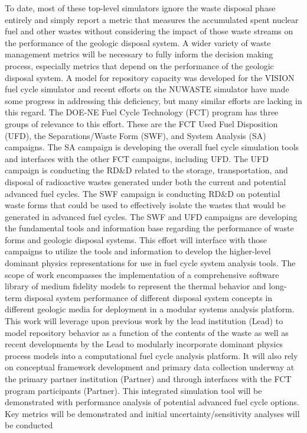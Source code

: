 To date, most of these top-level simulators ignore the waste disposal 
phase entirely and simply report a metric that measures the 
accumulated spent nuclear fuel and other wastes without considering 
the impact of those waste streams on the performance of the geologic 
disposal system.  A wider variety of waste management metrics will be 
necessary to fully inform the decision making process, especially 
metrics that depend on the performance of the geologic disposal 
system.  A model for repository capacity was developed for the VISION 
fuel cycle simulator \cite{yacout_visionverifiable_2006} and recent efforts on the NUWASTE 
simulator \cite{ abkowitz_nuclear_2010} have made some progress in addressing this 
deficiency, but many similar efforts are lacking in this regard.  The 
DOE-NE Fuel Cycle Technology (FCT) program has three groups of 
relevance to this effort.  These are the FCT Used Fuel Disposition 
(UFD), the Separations/Waste Form (SWF), and System Analysis (SA) 
campaigns.  The SA campaign is developing the overall fuel cycle 
simulation tools and interfaces with the other FCT campaigns, 
including UFD.  The UFD campaign is conducting the RD\&D related to 
the storage, transportation, and disposal of radioactive wastes 
generated under both the current and potential advanced fuel cycles.  
The SWF campaign is conducting RD\&D on potential waste forms that 
could be used to effectively isolate the wastes that would be 
generated in advanced fuel cycles.  The SWF and UFD campaigns are 
developing the fundamental tools and information base regarding the 
performance of waste forms and geologic disposal systems.  This effort 
will interface with those campaigns to utilize the tools and 
information to develop the higher-level dominant physics 
representations for use in fuel cycle system analysis tools.  The 
scope of work encompasses the implementation of a comprehensive 
software library of medium fidelity models to represent the thermal 
behavior and long-term disposal system performance of different 
disposal system concepts in different geologic media for deployment in 
a modular systems analysis platform.  This work will leverage upon 
previous work by the lead institution (Lead) to model repository 
behavior as a function of the contents of the waste as well as recent 
developments by the Lead to modularly incorporate dominant physics 
process models into a computational fuel cycle analysis platform.  It 
will also rely on conceptual framework development and primary data 
collection underway at the primary partner institution (Partner) and 
through interfaces with the FCT program participants (Partner).  This 
integrated simulation tool will be demonstrated with performance 
analysis of potential advanced fuel cycle options.  Key metrics will 
be demonstrated and initial uncertainty/sensitivity analyses will be 
conducted

